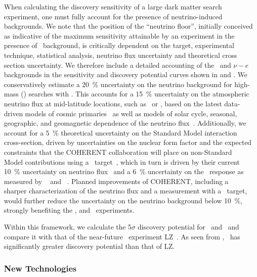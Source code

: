 When calculating the discovery sensitivity of a large dark matter search experiment, one must fully account for the presence of neutrino-induced backgrounds.  We note that the position of the ``neutrino floor'', initially conceived as indicative of the maximum sensitivity attainable by an experiment in the presence of \CEnNS\ background, is critically dependent on the target, experimental technique, statistical analysis, neutrino flux uncertainty and theoretical cross section uncertainty. We therefore include a detailed accounting of the \CEnNS\ and $\nu-e$ backgrounds in the sensitivity and discovery potential curves shown in  and . We conservatively estimate a \SI{20}{\percent} uncertainty on the neutrino background for high-mass (\DSkHighMassThreshold) searches with \Argo.  This accounts for a \SI{15}{\percent} uncertainty on the atmospheric neutrino flux at mid-latitude locations, such as \SNOLAB\ or \LNGS, based on the latest data-driven models of cosmic primaries~\cite{Evans:2017hu} as well as models of solar cycle, seasonal, geographic, and geomagnetic dependence of the neutrino flux~\cite{Honda:2011ey,Barr:2006ih}.  Additionally, we account for a \SI{5}{\percent} theoretical uncertainty on the Standard Model interaction cross-section, driven by uncertainties on the nuclear form factor and the expected constraints that the COHERENT collaboration will place on non-Standard Model contributions using a \LAr\ target~\cite{Tayloe:2018jn}, which in turn is driven by their current \SI{10}{\percent} uncertainty on neutrino flux~\cite{Akimov:2017bs} and a \SI{6}{\percent} uncertainty on the \LAr\ response as measured by \SCENE~\cite{Cao:2015ks,Alexander:2013ke} and \ARIS~\cite{Agnes:2018cn}.  Planned improvements of COHERENT, including a sharper characterization of the neutrino flux and a measurement with a \LAr\ target, would further reduce the uncertainty on the neutrino background below \SI{10}{\percent}, strongly benefiting the \DSks, and \Argo\ experiments.

Within this framework, we calculate the 5$\sigma$ discovery potential for \DSks\ and \Argo\ and compare it with that of the near-future \LXe\ experiment LZ~\cite{Dobson:2018us}.  As seen from , \DSks\ has significantly greater discovery potential than that of LZ.


\subsubsection{New Technologies}
\label{sec:technologies}

